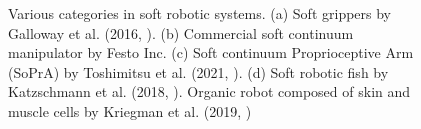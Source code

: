 \begin{figure}[!t]
  \vspace{-2mm}
  \ifx\printFigures\undefined
  \else
  \centering
  \hspace{2mm}
  \vspace{-7mm}
  \fi
  \caption{Various categories in soft robotic systems. (a) Soft grippers by Galloway et al. (2016, \cite{Galloway2016}). (b) Commercial soft continuum manipulator by Festo Inc. \cite{Gravagne2001Oct} (c) Soft continuum Proprioceptive Arm (SoPrA) by Toshimitsu et al. (2021, \cite{Toshimitsu2021Sep,Wand2022Apr}). (d) Soft robotic fish by Katzschmann et al. (2018, \cite{Katzschmann2018}). Organic robot composed of skin and muscle cells by Kriegman et al. (2019, \cite{Kriegman2019})}
  \label{fig:C0:typesofrobots}
  \vspace{-4mm}
\end{figure}
%
%
